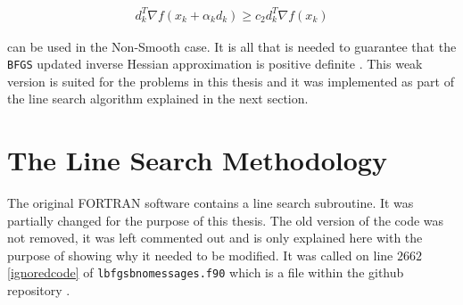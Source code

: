 \begin{equation}
  \begin{aligned}
    d_k^T \nabla f(x_k + \alpha _k d_k) \geq c_2 d_k^T \nabla f(x_k)
  \end{aligned}
\end{equation}

can be used in the Non-Smooth case. It is all that is needed to guarantee that the \texttt{BFGS} updated inverse Hessian approximation is positive definite \citep{overtonlewis}. This weak version is suited for the problems in this thesis and it was implemented as part of the line search algorithm explained in the next section.

\section{The Line Search Methodology}

The original \textsc{FORTRAN} software \citep{lbfgsbsoftware} contains a line search subroutine. It was partially changed for the purpose of this thesis. The old version of the code was not removed, it was left commented out and is only explained here with the purpose of showing why it needed to be modified. It was called on line $2662$ \eqref{ignoredcode} of \texttt{lbfgsbnomessages.f90} which is a file within the github repository \citep{lbfgsbNS}.

